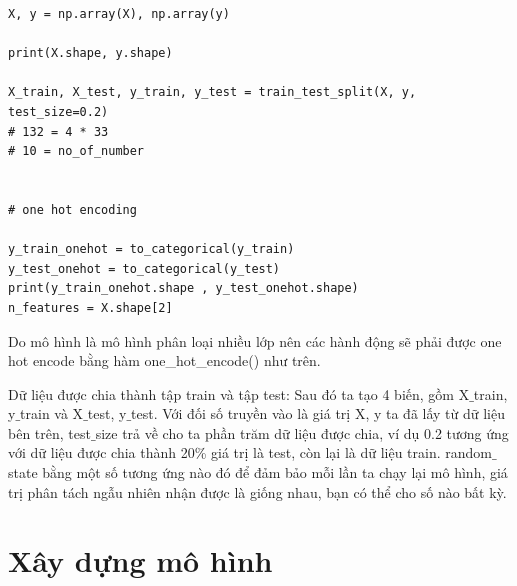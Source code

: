 \begin{lstlisting}[style=codePython]
    X, y = np.array(X), np.array(y)

print(X.shape, y.shape)

X_train, X_test, y_train, y_test = train_test_split(X, y, test_size=0.2)
# 132 = 4 * 33
# 10 = no_of_number


# one hot encoding

y_train_onehot = to_categorical(y_train)
y_test_onehot = to_categorical(y_test)
print(y_train_onehot.shape , y_test_onehot.shape)
n_features = X.shape[2]
\end{lstlisting}

Do mô hình là mô hình phân loại nhiều lớp nên các hành động sẽ phải được one hot encode bằng hàm one\_hot\_encode() như trên.

Dữ liệu được chia thành tập train và tập test: Sau đó ta tạo 4 biến, gồm X$\_$train, y$\_$train và X$\_$test, y$\_$test. Với đối số truyền vào là giá trị X, y ta đã lấy từ dữ liệu bên trên, test$\_$size trả về cho ta phần trăm dữ liệu được chia, ví dụ 0.2 tương ứng với dữ liệu được chia thành 20\% giá trị là test, còn lại là dữ liệu train. random$\_$state bằng một số tương ứng nào đó để đảm bảo mỗi lần ta chạy lại mô hình, giá trị phân tách ngẫu nhiên nhận được là giống nhau, bạn có thể cho số nào bất kỳ.  


\section{Xây dựng mô hình}

